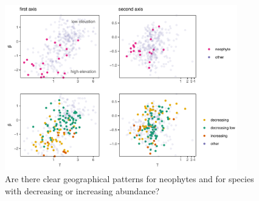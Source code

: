 \documentclass[11pt, a4paper]{article}
\begin{document}
\begin{figure}[h]
  \centering
    \vspace{0.5cm}
    \includegraphics[width=0.9\textwidth]{figures/invasive}
    	  \vspace{0.3cm}
	   \caption{Are there clear geographical patterns for neophytes and for species with decreasing or increasing abundance?}
      \label{fig:neophytes}
\end{figure}

\clearpage

\end{document}
